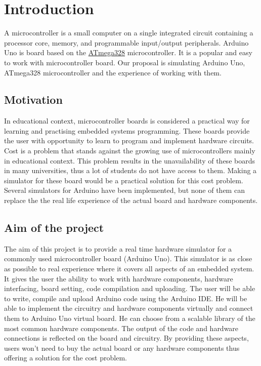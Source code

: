 \chapter{Introduction}
\label{chap:intro}

A microcontroller is a small computer on a single integrated circuit containing a processor core, memory, and programmable input/output peripherals\cite{Wikidef:URL}. Arduino Uno is board based on the \href{http://www.atmel.com/devices/atmega328.aspx?tab=overview}{ATmega328} microcontroller. It is a popular and easy to work with microcontroller board. Our proposal is simulating Arduino Uno, ATmega328 microcontroller and the experience of working with them.

\section{Motivation} \label{sec:s1}
In educational context, microcontroller boards is considered a practical way for learning and practising embedded systems programming. These boards provide the user with opportunity to learn to program and implement hardware circuits. Cost is a problem that stands against the growing use of microcontrollers mainly in educational context. This problem results in the unavailability of these boards in many universities, thus a lot of students do not have access to them. Making a simulator for these board would be a practical solution for this cost problem. Several simulators for Arduino have been implemented, but none of them can replace the the real life experience of the actual board and hardware components.

\section{Aim of the project}
The aim of this project is to provide a real time hardware simulator for a commonly used microcontroller board (Arduino Uno). This simulator is as close as possible to real experience where it covers all aspects of an embedded system. It gives the user the ability to work with hardware components, hardware interfacing, board setting, code compilation and uploading. The user will be able to write, compile and upload Arduino code using the Arduino IDE. He will be able to implement the circuitry and hardware components virtually and connect them to Arduino Uno virtual board. He can choose from a scalable library of the most common hardware components. The output of the code and hardware connections is reflected on the board and circuitry. By providing these aspects, users won’t need to buy the actual board or any hardware components thus offering a solution for the cost problem.
